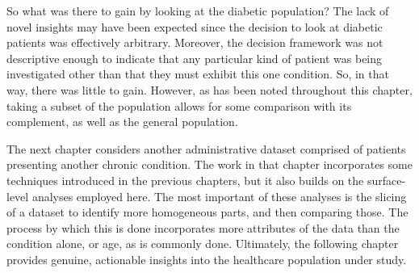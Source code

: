 So what was there to gain by looking at the diabetic population? The lack of
novel insights may have been expected since the decision to look at diabetic
patients was effectively arbitrary. Moreover, the decision framework was not
descriptive enough to indicate that any particular kind of patient was being
investigated other than that they must exhibit this one condition. So, in that
way, there was little to gain. However, as has been noted throughout this
chapter, taking a subset of the population allows for some comparison with its
complement, as well as the general population.

The next chapter considers another administrative dataset comprised of patients
presenting another chronic condition. The work in that chapter incorporates some
techniques introduced in the previous chapters, but it also builds on the
surface-level analyses employed here. The most important of these analyses is
the slicing of a dataset to identify more homogeneous parts, and then comparing
those. The process by which this is done incorporates more attributes of the
data than the condition alone, or age, as is commonly done. Ultimately, the
following chapter provides genuine, actionable insights into the healthcare
population under study.

